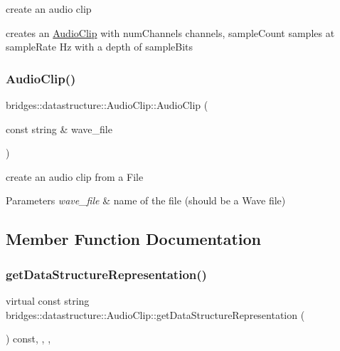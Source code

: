 create an audio clip 

creates an \hyperlink{classbridges_1_1datastructure_1_1_audio_clip}{Audio\+Clip} with num\+Channels channels, sample\+Count samples at sample\+Rate Hz with a depth of sample\+Bits \mbox{\label{classbridges_1_1datastructure_1_1_audio_clip_a3e13f90a853b5a2053725f550393f0de}} 
\subsubsection{\texorpdfstring{Audio\+Clip()}{AudioClip()}\hspace{0.1cm}{\footnotesize\ttfamily [2/2]}}
{\footnotesize\ttfamily bridges\+::datastructure\+::\+Audio\+Clip\+::\+Audio\+Clip (\begin{DoxyParamCaption}\item[{const string \&}]{wave\+\_\+file }\end{DoxyParamCaption})\hspace{0.3cm}{\ttfamily [inline]}}



create an audio clip from a File 


\begin{DoxyParams}{Parameters}
{\em wave\+\_\+file} & name of the file (should be a Wave file) \\
\hline
\end{DoxyParams}


\subsection{Member Function Documentation}
\mbox{\label{classbridges_1_1datastructure_1_1_audio_clip_a9ff485d7b2e0211d9e5c1432d47be617}} 
\subsubsection{\texorpdfstring{get\+Data\+Structure\+Representation()}{getDataStructureRepresentation()}}
{\footnotesize\ttfamily virtual const string bridges\+::datastructure\+::\+Audio\+Clip\+::get\+Data\+Structure\+Representation (\begin{DoxyParamCaption}{ }\end{DoxyParamCaption}) const\hspace{0.3cm}{\ttfamily [inline]}, {\ttfamily [final]}, {\ttfamily [override]}, {\ttfamily [virtual]}}

